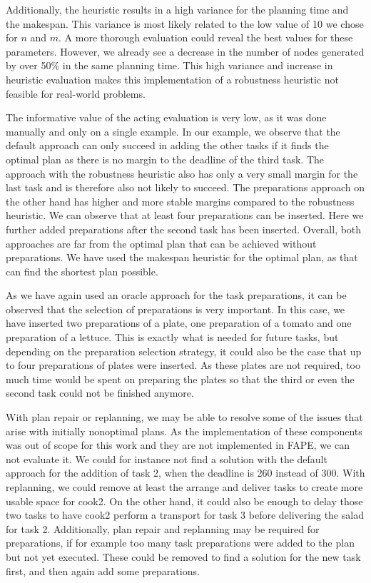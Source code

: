 Additionally, the heuristic results in a high variance for the planning time and the makespan.
This variance is most likely related to the low value of 10 we chose for $n$ and $m$.
A more thorough evaluation could reveal the best values for these parameters.
However, we already see a decrease in the number of nodes generated by over 50\% in the same planning time.
This high variance and increase in heuristic evaluation makes this implementation of a robustness heuristic not feasible for real-world problems.

The informative value of the acting evaluation is very low, as it was done manually and only on a single example.
In our example, we observe that the default approach can only succeed in adding the other tasks if it finds the optimal plan as there is no margin to the deadline of the third task.
The approach with the robustness heuristic also has only a very small margin for the last task and is therefore also not likely to succeed.
The preparations approach on the other hand has higher and more stable margins compared to the robustness heuristic.
We can observe that at least four preparations can be inserted.
Here we further added preparations after the second task has been inserted.
Overall, both approaches are far from the optimal plan that can be achieved without preparations.
We have used the makespan heuristic for the optimal plan, as that can find the shortest plan possible.

As we have again used an oracle approach for the task preparations, it can be observed that the selection of preparations is very important.
In this case, we have inserted two preparations of a plate, one preparation of a tomato and one preparation of a lettuce.
This is exactly what is needed for future tasks, but depending on the preparation selection strategy, it could also be the case that up to four preparations of plates were inserted.
As these plates are not required, too much time would be spent on preparing the plates so that the third or even the second task could not be finished anymore.

With plan repair or replanning, we may be able to resolve some of the issues that arise with initially nonoptimal plans.
As the implementation of these components was out of scope for this work and they are not implemented in FAPE, we can not evaluate it.
We could for instance not find a solution with the default approach for the addition of task 2, when the deadline is 260 instead of 300.
With replanning, we could remove at least the arrange and deliver tasks to create more usable space for cook2.
On the other hand, it could also be enough to delay those two tasks to have cook2 perform a transport for task 3 before delivering the salad for task 2.
Additionally, plan repair and replanning may be required for preparations, if for example too many task preparations were added to the plan but not yet executed.
These could be removed to find a solution for the new task first, and then again add some preparations.

